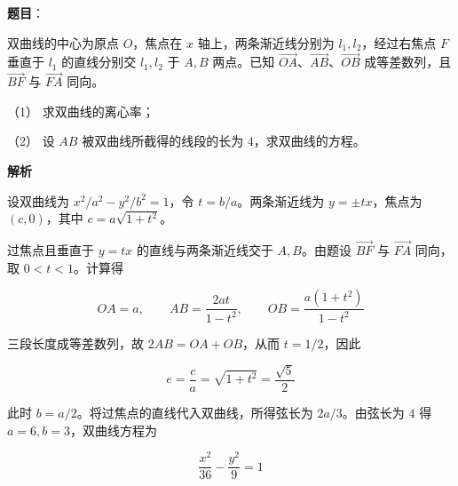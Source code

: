 \begin{answer}

\textbf{题目}：

双曲线的中心为原点 $O$，焦点在 $x$ 轴上，两条渐近线分别为 $l_1,l_2$，经过右焦点 $F$ 垂直于 $l_1$ 的直线分别交 $l_1,l_2$ 于 $A,B$ 两点。已知 $\overrightarrow{OA}$、$\overrightarrow{AB}$、$\overrightarrow{OB}$ 成等差数列，且 $\overrightarrow{BF}$ 与 $\overrightarrow{FA}$ 同向。

（1） 求双曲线的离心率；

（2） 设 $AB$ 被双曲线所截得的线段的长为 $4$，求双曲线的方程。

\textbf{解析}


设双曲线为 $x^2/a^2-y^2/b^2=1$，令 $t=b/a$。两条渐近线为 $y=\pm tx$，焦点为 $(c,0)$，其中 $c=a\sqrt{1+t^2}$。

过焦点且垂直于 $y=tx$ 的直线与两条渐近线交于 $A,B$。由题设 $\overrightarrow{BF}$ 与 $\overrightarrow{FA}$ 同向，取 $0<t<1$。计算得

\nopagebreak[4]
\[
OA=a,\qquad AB=\frac{2at}{1-t^2},\qquad OB=\frac{a(1+t^2)}{1-t^2}
\]

三段长度成等差数列，故 $2AB=OA+OB$，从而 $t=1/2$，因此

\nopagebreak[4]
\[
e=\frac ca=\sqrt{1+t^2}=\frac{\sqrt5}{2}
\]


此时 $b=a/2$。将过焦点的直线代入双曲线，所得弦长为 $2a/3$。由弦长为 $4$ 得 $a=6,b=3$，双曲线方程为

\nopagebreak[4]
\[
\frac{x^2}{36}-\frac{y^2}{9}=1
\]



\end{answer}